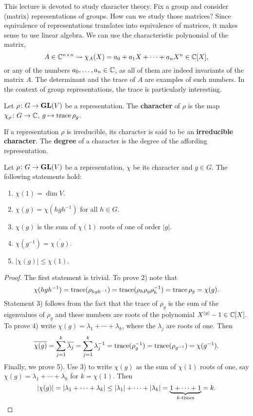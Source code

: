 
This lecture is devoted to study character theory. Fix a group and consider
(matrix) representations of groups. How can we study those matrices? Since 
equivalence of representations translates into equivalence of matrices, 
it makes sense to use linear algebra. We can use 
the characteristic polynomial of the matrix, 
\[
A\in\mathbb{C}^{n\times n}\rightsquigarrow \chi_A(X)=a_0+a_1X+\cdots+a_nX^n\in \mathbb{C}[X], 
\]
or any of the numbers $a_0,\dots,a_n\in\mathbb{C}$, as all of them are indeed invariants of the matrix $A$.
The determinant and the trace of $A$ are examples of such numbers. In the context of group representations,  
the trace is particularly interesting. 

\begin{definition}
	Let $\rho\colon G\to\mathbf{GL}(V)$ be a representation. The \textbf{character} of $\rho$ 
	is the map $\chi_\rho\colon G\to\mathbb{C}$, $g\mapsto\operatorname{trace}\rho_g$. 	
\end{definition}

If a representation $\rho$ is irreducible, its character is said to be an 
\textbf{irreducible character}. The \textbf{degree} of a character is the degree of the affording
representation. 

\begin{proposition}
	Let $\rho\colon G\to\mathbf{GL}(V)$ be a representation, $\chi$ be its character and $g\in G$.
	The following statements hold:
	\begin{enumerate}
		\item $\chi(1)=\dim V$. 
		\item $\chi(g)=\chi(hgh^{-1})$ for all $h\in G$.
		\item $\chi(g)$ is the sum of $\chi(1)$ roots of one of order $|g|$. 
		\item $\chi(g^{-1})=\overline{\chi(g)}$. 
		\item $|\chi(g)|\leq\chi(1)$.  
	\end{enumerate} 
\end{proposition}

\begin{proof}
	The first statement is trivial. 	To prove 2) note that
	\[
	\chi(hgh^{-1})=\operatorname{trace}(\rho_{hgh^{-1}})=\operatorname{trace}(\rho_h\rho_g\rho_h^{-1})=\operatorname{trace}\rho_g=\chi(g).
	\]
	Statement 3) follows from the fact that the trace of $\rho_g$ is the sum
	of the eigenvalues of $\rho_g$ and these numbers are roots of the polynomial
	$X^{|g|}-1\in\mathbb{C}[X]$. To prove 4) write $\chi(g)=\lambda_1+\cdots+\lambda_k$, where 
	the $\lambda_j$ are roots of one. Then
	\[
	\overline{\chi(g)}=\sum^k_{j=1}\overline{\lambda_j}
	=\sum_{j=1}^k\lambda_j^{-1}
	=\operatorname{trace}(\rho_g^{-1})
	=\operatorname{trace}(\rho_{g^{-1}})
	=\chi(g^{-1}).
	\] 
	Finally, we prove 5). Use 3) to write $\chi(g)$ as the sum of
	$\chi(1)$ roots of one, say $\chi(g)=\lambda_1+\cdots+\lambda_k$ for
	$k=\chi(1)$. Then 
	\[
	|\chi(g)|=|\lambda_1+\cdots+\lambda_k|\leq |\lambda_1|+\cdots+|\lambda_k|
	=\underbrace{1+\cdots+1}_{\text{$k$-times}}=k.\qedhere
	\]
\end{proof}

